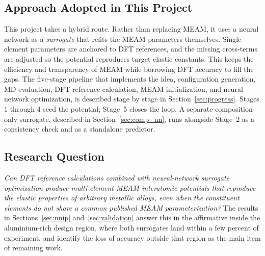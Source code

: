 \subsection{Approach Adopted in This Project}
This project takes a hybrid route. Rather than replacing MEAM, it uses a
neural network as a \emph{surrogate} that refits the MEAM parameters
themselves. Single-element parameters are anchored to DFT
\citep{kohn1965,giannozzi2009} references, and the missing cross-terms are
adjusted so the potential reproduces target elastic constants. This keeps the
efficiency and transparency of MEAM while borrowing DFT accuracy to fill the
gaps. The five-stage pipeline that implements the idea, configuration
generation, MD evaluation, DFT reference calculation, MEAM initialization,
and neural-network optimization, is described stage by stage in
Section~\ref{sec:progress}. Stages 1 through 4 seed the potential; Stage~5
closes the loop. A separate composition-only surrogate, described in
Section~\ref{sec:comp_nn}, runs alongside Stage~2 as a consistency check and
as a standalone predictor.

\subsection{Research Question}
\textit{Can DFT reference calculations combined with neural-network surrogate
optimization produce multi-element MEAM interatomic potentials that
reproduce the elastic properties of arbitrary metallic alloys, even when the
constituent elements do not share a common published MEAM
parameterization?} The results in Sections~\ref{sec:nnip}
and~\ref{sec:validation} answer this in the affirmative inside the
aluminium-rich design region, where both surrogates land within a few percent
of experiment, and identify the loss of accuracy outside that region as the
main item of remaining work.

